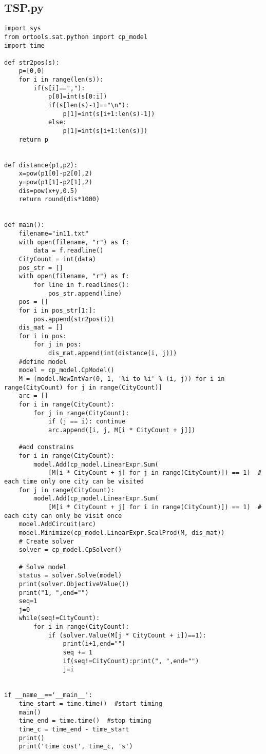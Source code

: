 \documentclass{article}
\begin{document}
\subsection*{TSP.py}
\begin{verbatim}
import sys
from ortools.sat.python import cp_model
import time

def str2pos(s):
    p=[0,0]
    for i in range(len(s)):
        if(s[i]==","):
            p[0]=int(s[0:i])
            if(s[len(s)-1]=="\n"):
                p[1]=int(s[i+1:len(s)-1])
            else:
                p[1]=int(s[i+1:len(s)])
    return p


def distance(p1,p2):
    x=pow(p1[0]-p2[0],2)
    y=pow(p1[1]-p2[1],2)
    dis=pow(x+y,0.5)
    return round(dis*1000)


def main():
    filename="in11.txt"
    with open(filename, "r") as f:
        data = f.readline()
    CityCount = int(data)
    pos_str = []
    with open(filename, "r") as f:
        for line in f.readlines():
            pos_str.append(line)
    pos = []
    for i in pos_str[1:]:
        pos.append(str2pos(i))
    dis_mat = []
    for i in pos:
        for j in pos:
            dis_mat.append(int(distance(i, j)))
    #define model
    model = cp_model.CpModel()
    M = [model.NewIntVar(0, 1, '%i to %i' % (i, j)) for i in range(CityCount) for j in range(CityCount)]
    arc = []
    for i in range(CityCount):
        for j in range(CityCount):
            if (j == i): continue
            arc.append([i, j, M[i * CityCount + j]])

    #add constrains
    for i in range(CityCount):
        model.Add(cp_model.LinearExpr.Sum(
            [M[i * CityCount + j] for j in range(CityCount)]) == 1)  # each time only one city can be visited
    for j in range(CityCount):
        model.Add(cp_model.LinearExpr.Sum(
            [M[i * CityCount + j] for i in range(CityCount)]) == 1)  # each city can only be visit once
    model.AddCircuit(arc)
    model.Minimize(cp_model.LinearExpr.ScalProd(M, dis_mat))
    # Create solver
    solver = cp_model.CpSolver()

    # Solve model
    status = solver.Solve(model)
    print(solver.ObjectiveValue())
    print("1, ",end="")
    seq=1
    j=0
    while(seq!=CityCount):
        for i in range(CityCount):
            if (solver.Value(M[j * CityCount + i])==1):
                print(i+1,end="")
                seq += 1
                if(seq!=CityCount):print(", ",end="")
                j=i


if __name__=='__main__':
    time_start = time.time()  #start timing
    main()
    time_end = time.time()  #stop timing
    time_c = time_end - time_start
    print()
    print('time cost', time_c, 's')

\end{verbatim}
\end{document}
